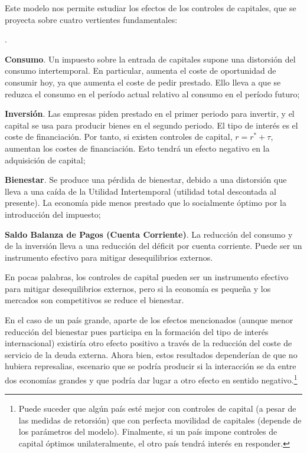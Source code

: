 \documentclass[10pt,a4paper]{article}
\newcounter{numitem}
\newenvironment{lnum}
      {\begin{list}{\arabic{numitem}.}{%
          \usecounter{numitem}%
          \setlength{\leftmargin}{1cm}%
          \setlength{\parskip}{3pt}%
          \setlength{\itemsep}{0pt}%
          \setlength{\parsep}{0pt}%
      }}
      {\end{list}}
\begin{document}
Este modelo nos permite estudiar los efectos de los controles de capitales, que se proyecta sobre cuatro vertientes fundamentales:
\begin{lnum}
    \item \textbf{Consumo}. Un impuesto sobre la entrada de capitales supone una distorsión del consumo intertemporal. En particular, aumenta el coste de oportunidad de consumir hoy, ya que aumenta el coste de pedir prestado. Ello lleva a que se reduzca el consumo en el período actual relativo al consumo en el período futuro;
    \item \textbf{Inversión}. Las empresas piden prestado en el primer periodo para invertir, y el capital se usa para producir bienes en el segundo periodo. El tipo de interés es el coste de financiación. Por tanto, si existen controles de capital, $r=r^*+\tau$, aumentan los costes de financiación. Esto tendrá un efecto negativo en la adquisición de capital;
    \item \textbf{Bienestar}. Se produce una pérdida de bienestar, debido a una distorsión que lleva a una caída de la Utilidad Intertemporal (utilidad total descontada al presente). La economía pide menos prestado que lo socialmente óptimo por la introducción del impuesto;
    \item \textbf{Saldo Balanza de Pagos (Cuenta Corriente)}. La reducción del consumo y de la inversión lleva a una reducción del déficit por cuenta corriente. Puede ser un instrumento efectivo para mitigar desequilibrios externos. 
\end{lnum}

En pocas palabras, los controles de capital pueden ser un instrumento efectivo para mitigar desequilibrios externos, pero si la economía es pequeña y los mercados son competitivos se reduce el bienestar. 

En el caso de un país grande, aparte de los efectos mencionados (aunque menor reducción del bienestar pues participa en la formación del tipo de interés internacional) existiría otro efecto positivo a través de la reducción del coste de servicio de la deuda externa. Ahora bien, estos resultados dependerían de que no hubiera represalias, escenario que se podría producir si la interacción se da entre dos economías grandes y que podría dar lugar a otro efecto en sentido negativo.\footnote{%
    Puede suceder que algún país esté mejor con controles de capital (a pesar de las medidas de retorsión) que con perfecta movilidad de capitales (depende de los parámetros del modelo). Finalmente, si un país impone controles de capital óptimos unilateralmente, el otro país tendrá interés en responder.
} 
\end{document}
